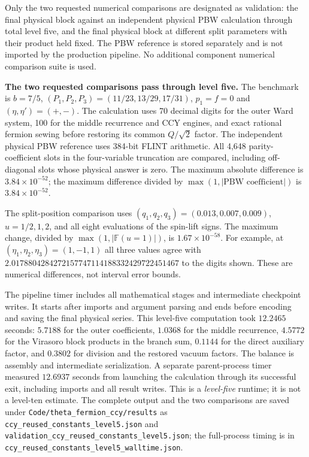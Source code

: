 \documentclass[12pt]{article}
\numberwithin{equation}{section}
\begin{document}
Only the two requested numerical comparisons are designated as
validation: the final physical block against an independent physical
PBW calculation through total level five, and the final physical block
at different split parameters with their product held fixed.  The PBW
reference is stored separately and is not imported by the production
pipeline.  No additional component numerical comparison suite is used.

\textbf{The two requested comparisons pass through level five.}
The benchmark is $b=7/5$, $(P_1,P_2,P_3)=(11/23,13/29,17/31)$,
$p_1=f=0$ and $(\eta,\eta')=(+,-)$.  The calculation uses 70 decimal
digits for the outer Ward system, 100 for the middle recurrence and CCY
engines, and exact rational fermion sewing before restoring its common
$Q/\sqrt2$ factor.  The
independent physical PBW reference uses 384-bit FLINT arithmetic.
All 4,648 parity-coefficient slots in the four-variable truncation are
compared, including off-diagonal slots whose physical answer is zero.
The maximum absolute difference is $3.84\times10^{-52}$; the maximum
difference divided by $\max(1,|\text{PBW coefficient}|)$ is
$3.84\times10^{-52}$.

The split-position comparison uses $(q_1,q_2,q_3)=(0.013,0.007,0.009)$,
$u=1/2,1,2$, and all eight evaluations of the spin-lift signs.  The
maximum change, divided by $\max(1,|\mathbb F(u=1)|)$, is
$1.67\times10^{-58}$.  For example, at $(\eta_1,\eta_2,\eta_3)=(1,-1,1)$
all three values agree with $2.0178804284272157747114188332429722451467$
to the digits shown.
These are numerical differences, not interval error bounds.

The pipeline timer includes all mathematical stages and intermediate
checkpoint writes.  It starts after imports and argument parsing and
ends before encoding and saving the final physical series.
This level-five computation took $12.2465$ seconds: $5.7188$ for the
outer coefficients, $1.0368$ for the middle recurrence, $4.5772$ for
the Virasoro block products in the branch sum, $0.1144$ for the direct
auxiliary factor, and $0.3802$ for division and the restored vacuum
factors.  The balance is
assembly and intermediate serialization.  A separate parent-process
timer measured $12.6937$ seconds from launching the calculation through
its successful exit, including imports and all result writes.
This is a \emph{level-five}
runtime; it is not a level-ten estimate.  The complete output and the
two comparisons are saved under \texttt{Code/theta\_fermion\_ccy/results}
as \texttt{ccy\_reused\_constants\_level5.json} and
\texttt{validation\_ccy\_reused\_constants\_level5.json}; the full-process
timing is in \texttt{ccy\_reused\_constants\_level5\_walltime.json}.
\end{document}
